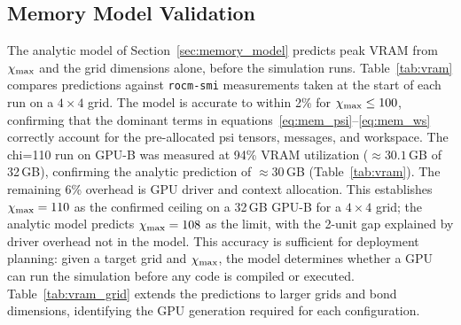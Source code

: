 \FloatBarrier
\subsection{Memory Model Validation}
\label{sec:memory_validation}

The analytic model of Section~\ref{sec:memory_model} predicts peak VRAM from
$\chi_{\mathrm{max}}$ and the grid dimensions alone, before the simulation runs.
Table~\ref{tab:vram} compares predictions against \texttt{rocm-smi} measurements
taken at the start of each run on a $4\times4$ grid.
The model is accurate to within 2\% for $\chi_{\mathrm{max}} \leq 100$, confirming that
the dominant terms in equations~\eqref{eq:mem_psi}--\eqref{eq:mem_ws} correctly
account for the pre-allocated psi tensors, messages, and workspace.
The chi=110 run on GPU-B was measured at 94\% VRAM utilization
($\approx 30.1$\,GB of 32\,GB), confirming the analytic prediction
of $\approx 30$\,GB (Table~\ref{tab:vram}).
The remaining 6\% overhead is GPU driver and context allocation.
This establishes $\chi_{\mathrm{max}} = 110$ as the confirmed ceiling on a 32\,GB GPU-B
for a $4\times4$ grid; the analytic model predicts $\chi_{\mathrm{max}} = 108$ as the
limit, with the 2-unit gap explained by driver overhead not in the model.
This accuracy is sufficient for deployment planning: given a target grid and
$\chi_{\mathrm{max}}$, the model determines whether a GPU can run the simulation before any
code is compiled or executed.
Table~\ref{tab:vram_grid} extends the predictions to larger grids and bond
dimensions, identifying the GPU generation required for each configuration.


